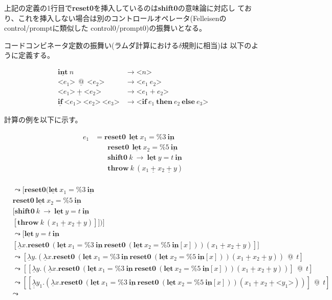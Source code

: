 \documentclass[T]{compsoft}
\makeatletter
\newcommand\Resetz{\textbf{reset0}}
\newcommand\Shiftz{\textbf{shift0}}
\newcommand\Throw{\textbf{throw}}
\newcommand\cfun[2]{\underline{\lambda}{#1}.{#2}}
\newcommand\ccfun[2]{\underline{\underline{\lambda}}{#1}.{#2}}
\newcommand\cPlus{\underline{\textbf{+}}}
\newcommand\cLet{\underline{\textbf{let}}}
\newcommand\cIn{\underline{\textbf{in}}}
\newcommand\csp[1]{\texttt{\%}{#1}}
\newcommand\cint{\underline{\textbf{int}}}
\newcommand\code[1]{\texttt{<}{#1}\texttt{>}}
\newcommand\ift[3]{\textbf{if}~{#1}~\textbf{then}~{#2}~\textbf{else}~{#3}}
\newcommand\cif[3]{\underline{\textbf{if}}~\code{{#1}}~\code{{#2}}~\code{{#3}}}
\newcommand\lto{\leadsto}
\newcommand\cat{~\underline{@}~}
\theoremstyle{break}
\makeatother
\begin{document}
上記の定義の1行目で\Resetz を挿入しているのは{\Shiftz}の意味論に対応し
ており、これを挿入しない場合は別のコントロールオペレータ(Felleisenの
control/promptに類似した control0/prompt0)の振舞いとなる。

コードコンビネータ定数の振舞い(ラムダ計算における$\delta$規則に相当)は
以下のように定義する。

\begin{align*}
  \cint~ n &\to \code{n} \\
  \code{e_1}~ \cat~ \code{e_2} &\to \code{e_1~ e_2} \\
  \code{e_1}~ \cPlus~ \code{e_2} &\to \code{e_1 + e_2} \\
  \cif{e_1}{e_2}{e_3} &\to \code{\ift{e_1}{e_2}{e_3}} 
\end{align*}

計算の例を以下に示す。

\begin{align*}
  e_1 & = \Resetz ~~\cLet~x_1=\csp{3}~\cIn \\
      & \phantom{=}~~ \Resetz ~~\cLet~x_2=\csp{5}~\cIn \\
      & \phantom{=}~~ \Shiftz~k~\to~\cLet~y=t~\cIn \\
      & \phantom{=}~~ \Throw~ k~ (x_1~\cPlus~x_2~\cPlus~y) \\
\end{align*}

\begin{align*}
  [ e_1 ] &\lto [ \Resetz (\cLet~x_1=\csp{3}~\cIn \\
          &\Resetz~ \cLet~x_2=\csp{5}~\cIn \\
          &[ \Shiftz~ k~ \to~ \cLet~ y=t~ \cIn \\
          &[ \Throw~ k~(x_1~\cPlus~x_2~\cPlus~y) ] ] ) ] \\
          &\lto [ \cLet~ y=t~ \cIn \\
          &[ \cfun{x}{\Resetz~ (\cLet~x_1=\csp{3}~ \cIn~ \Resetz~ (\cLet~ x_2=\csp{5}~ \cIn [x]))} (x_1~\cPlus~x_2~\cPlus~y) ]] \\
          &\lto [ \cfun{y}{(\cfun{x}{\Resetz~ (\cLet~x_1=\csp{3}~ \cIn~ \Resetz~ (\cLet~ x_2=\csp{5}~ \cIn [x]))} (x_1~\cPlus~x_2~\cPlus~y))}~ \cat~ t ] \\
          &\lto [[\cfun{y}{(\cfun{x}{\Resetz~ (\cLet~x_1=\csp{3}~ \cIn~ \Resetz~ (\cLet~ x_2=\csp{5}~ \cIn [x]))} (x_1~\cPlus~x_2~\cPlus~y))}]~ \cat~ t] \\
          &\lto [[\ccfun{y_1}{(\cfun{x}{\Resetz~ (\cLet~x_1=\csp{3}~ \cIn~ \Resetz~ (\cLet~ x_2=\csp{5}~ \cIn [x]))} (x_1~\cPlus~x_2~\cPlus~ \code{y_1}))}]~ \cat~ t] \\
          &\lto
\end{align*}
\end{document}
